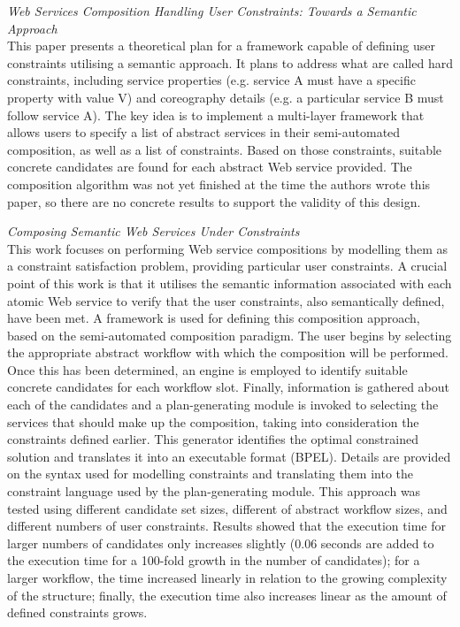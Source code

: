 \textit{Web Services Composition Handling User Constraints: Towards a Semantic Approach \cite{boustil2010web}}\\
This paper presents a theoretical plan for a framework capable of defining user constraints utilising a semantic
approach. It plans to address what are called hard constraints, including service properties (e.g. service A must
have a specific property with value V) and coreography details (e.g. a particular service B must follow service A).
The key idea is to implement a multi-layer framework that allows users to specify a list of abstract services in
their semi-automated composition, as well as a list of constraints. Based on those constraints, suitable concrete
candidates are found for each abstract Web service provided. The composition algorithm was not yet finished at
the time the authors wrote this paper, so there are no concrete results to support the validity of this design.

\textit{Composing Semantic Web Services Under Constraints \cite{karakoc2009composing}}\\
This work focuses on performing Web service compositions by modelling them as a constraint satisfaction problem,
providing particular user constraints. A crucial point of this work is that it utilises the semantic information
associated with each atomic Web service to verify that the user constraints, also semantically defined, have been
met. A framework is used for defining this composition approach, based on the semi-automated composition paradigm.
The user begins by selecting the appropriate abstract workflow with which the composition will be performed. Once
this has been determined, an engine is employed to identify suitable concrete candidates for each workflow slot.
Finally, information is gathered about each of the candidates and a plan-generating module is invoked to selecting
the services that should make up the composition, taking into consideration the constraints defined earlier. This
generator identifies the optimal constrained solution and translates it into an executable format (BPEL). Details
are provided on the syntax used for modelling constraints and translating them into the constraint language used
by the plan-generating module. This approach was tested using different candidate set sizes, different
of abstract workflow sizes, and different numbers of user constraints. Results showed that the execution time for
larger numbers of candidates only increases slightly (0.06 seconds are added to the execution time for a 100-fold
growth in the number of candidates); for a larger workflow, the time increased linearly in relation to the
growing complexity of the structure; finally, the execution time also increases linear as the amount of defined
constraints grows.

